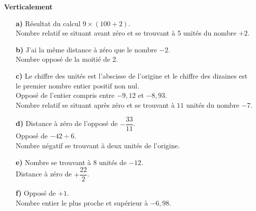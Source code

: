 \begin{multicols}{2}
   {\bf Verticalement} \\
   \begin{enumerate}
      \item[\textcolor{B1}{\bf a)}] Résultat du calcul $9\times(100+2)$. \\
         Nombre relatif se situant avant zéro et se trouvant à 5 unités du nombre $+2$. \\
      \item[\textcolor{B1}{\bf b)}] J'ai la même distance à zéro que le nombre $-2$. \\
         Nombre opposé de la moitié de 2. \\
      \item[\textcolor{B1}{\bf c)}] Le chiffre des unités est l'abscisse de l'origine et le chiffre des dizaines est le premier nombre entier positif non nul. \\
         Opposé de l'entier compris entre $-9,12$ et $-8,93$. \\
         Nombre relatif se situant après zéro et se trouvant à $11$ unités du nombre $-7$. \\
      \item[\textcolor{B1}{\bf d)}] Distance à zéro de l'opposé de $-\dfrac{33}{11}$. \\ [1mm]
         Opposé de $-42\div6$. \\
         Nombre négatif se trouvant à deux unités de l'origine. \\
      \item[\textcolor{B1}{\bf e)}] Nombre se trouvant à 8 unités de $-12$. \\ [1mm]
         Distance à zéro de $+\dfrac{22}{2}$. \\
      \item[\textcolor{B1}{\bf f)}] Opposé de $+1$. \\
         Nombre entier le plus proche et supérieur à $-6,98$.
   \end{enumerate}
\end{multicols}

